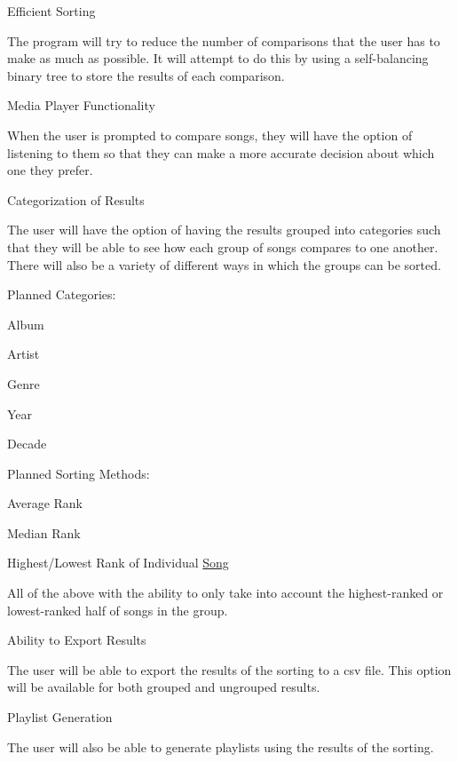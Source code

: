 \begin{DoxyItemize}
\item Efficient Sorting
\begin{DoxyItemize}
\item The program will try to reduce the number of comparisons that the user has to make as much as possible. It will attempt to do this by using a self-\/balancing binary tree to store the results of each comparison.
\end{DoxyItemize}
\item Media Player Functionality
\begin{DoxyItemize}
\item When the user is prompted to compare songs, they will have the option of listening to them so that they can make a more accurate decision about which one they prefer.
\end{DoxyItemize}
\item Categorization of Results
\begin{DoxyItemize}
\item The user will have the option of having the results grouped into categories such that they will be able to see how each group of songs compares to one another. There will also be a variety of different ways in which the groups can be sorted.
\item Planned Categories\+:
\begin{DoxyItemize}
\item Album
\item Artist
\item Genre
\item Year
\item Decade
\end{DoxyItemize}
\item Planned Sorting Methods\+:
\begin{DoxyItemize}
\item Average Rank
\item Median Rank
\item Highest/\+Lowest Rank of Individual \mbox{\hyperlink{class_song}{Song}}
\item All of the above with the ability to only take into account the highest-\/ranked or lowest-\/ranked half of songs in the group.
\end{DoxyItemize}
\end{DoxyItemize}
\item Ability to Export Results
\begin{DoxyItemize}
\item The user will be able to export the results of the sorting to a csv file. This option will be available for both grouped and ungrouped results.
\end{DoxyItemize}
\item Playlist Generation
\begin{DoxyItemize}
\item The user will also be able to generate playlists using the results of the sorting.
\end{DoxyItemize}
\end{DoxyItemize}

